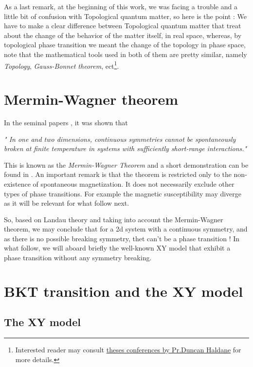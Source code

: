 \documentclass[a4paper,11pt]{article}
\begin{document}
As a last remark, at the beginning of this work, we was facing a trouble and a little bit of confusion with Topological quantum matter, so here is the point : We have to make a clear difference between Topological quantum matter that treat about the change of the behavior of the matter itself, in real space, whereas, by topological phase transition we meant the change of the topology in phase space, note that the mathematical tools used in both of them are pretty similar, namely \textit{Topology}, \textit{Gauss-Bonnet theorem}, ect\footnote{Interested reader may consult \href{https://wwwphy.princeton.edu//~haldane/research.html}{theses conferences by Pr.Duncan Haldane} for more details.}.


\section{Mermin-Wagner theorem} 

In the seminal papers \cite{mermin1966absence,hohenberg1967existence}, it was shown that 

\begin{center}\textit{"
In one and two dimensions, continuous symmetries cannot be spontaneously broken at finite temperature in systems with sufficiently short-range interactions."} \cite{wagner} 
\end{center}

This is known as the \textit{Mermin-Wagner Theorem} and a short demonstration can be found in \cite{wagner}. An important remark is that the theorem is restricted only to the non-existence of spontaneous magnetization. It does not necessarily exclude other types of phase transitions. For example the magnetic susceptibility may diverge as it will be relevant for what follow next.

So, based on Landau theory and taking into account the Mermin-Wagner theorem, we may conclude that for a 2d system with a continuous symmetry, and as there is no possible breaking symmetry, thet can't be a phase transition ! In what follow, we will aboard briefly the well-known XY model that exhibit a phase transition without any symmetry breaking. 

\section{BKT transition and the XY model}
\subsection{The XY model}
\end{document}
